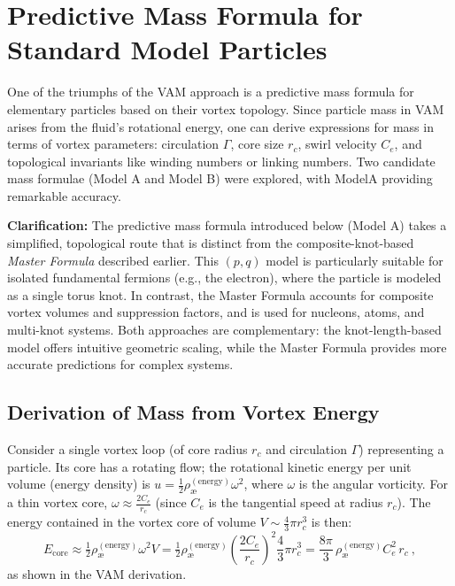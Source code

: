 \documentclass[a4paper,12pt]{article}
\begin{document}
\section{Predictive Mass Formula for Standard Model Particles}

One of the triumphs of the VAM approach is a predictive mass formula for elementary particles based on their vortex topology. Since particle mass in VAM arises from the fluid's rotational energy, one can derive expressions for mass in terms of vortex parameters: circulation $\Gamma$, core size $r_c$, swirl velocity $C_e$, and topological invariants like winding numbers or linking numbers. Two candidate mass formulae (Model A and Model B) were explored, with ModelA providing remarkable accuracy.

\begin{tcolorbox}[colback=gray!10,colframe=black!40,title=Clarification: Mass Formula Approaches]
    \textbf{Clarification:} The predictive mass formula introduced below (Model A) takes a simplified, topological route that is distinct from the composite-knot-based \textit{Master Formula} described earlier. This \((p,q)\) model is particularly suitable for isolated fundamental fermions (e.g., the electron), where the particle is modeled as a single torus knot. In contrast, the Master Formula accounts for composite vortex volumes and suppression factors, and is used for nucleons, atoms, and multi-knot systems. Both approaches are complementary: the knot-length-based model offers intuitive geometric scaling, while the Master Formula provides more accurate predictions for complex systems.
\end{tcolorbox}

\subsection{Derivation of Mass from Vortex Energy}

Consider a single vortex loop (of core radius $r_c$ and circulation $\Gamma$) representing a particle. Its core has a rotating flow; the rotational kinetic energy per unit volume (energy density) is $u = \tfrac{1}{2}\rho_{\text{\ae}}^{(\text{energy})}\omega^2$, where $\omega$ is the angular vorticity. For a thin vortex core, $\omega \approx \frac{2 C_e}{r_c}$ (since $C_e$ is the tangential speed at radius $r_c$). The energy contained in the vortex core of volume $V \sim \frac{4}{3}\pi r_c^3$ is then:
\[
    E_{\text{core}} \approx \tfrac{1}{2}\rho_{\text{\ae}}^{(\text{energy})}\omega^2 V = \tfrac{1}{2}\rho_{\text{\ae}}^{(\text{energy})}\left(\frac{2C_e}{r_c}\right)^2 \frac{4}{3}\pi r_c^3 = \frac{8\pi}{3}\,\rho_{\text{\ae}}^{(\text{energy})} C_e^2\, r_c~,
\]
as shown in the VAM derivation.
\end{document}
